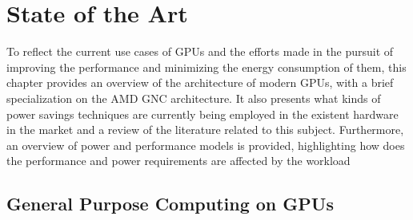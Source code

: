 
\chapter{State of the Art}
\label{chapter:stateoftheart}


To reflect the current use cases of GPUs and the efforts made in the pursuit of improving the performance and minimizing the energy consumption of them, this chapter provides an overview of the architecture of modern GPUs, with a brief specialization on the AMD GNC architecture. It also presents what kinds of power savings techniques are currently being employed in the existent hardware in the market and a review of the literature related to this subject. Furthermore, an overview of power and performance models is provided, highlighting how does the performance and power requirements are affected by the workload 


\section{General Purpose Computing on GPUs}
\label{section:gpuarch}

